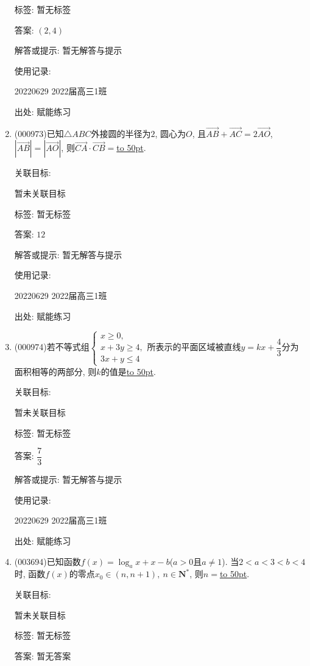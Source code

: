 \documentclass[10pt,a4paper]{article}
\newcommand{\blank}[1]{\underline{\hbox to #1pt{}}}
\begin{document}
\begin{enumerate}[1.]
标签: 暂无标签

答案: $(2,4)$

解答或提示: 暂无解答与提示

使用记录:

20220629    2022届高三1班  	


出处: 赋能练习
\item { (000973)}已知$\triangle ABC$外接圆的半径为$2$, 圆心为$O$, 且$\overrightarrow{AB}+\overrightarrow{AC}=2 \overrightarrow{AO}$, $|\overrightarrow{AB}|=|\overrightarrow{AO}|$, 则$\overrightarrow{CA}\cdot \overrightarrow{CB}=$\blank{50}.


关联目标:

暂未关联目标



标签: 暂无标签

答案: $12$

解答或提示: 暂无解答与提示

使用记录:

20220629    2022届高三1班  	


出处: 赋能练习
\item { (000974)}若不等式组$\begin{cases} x\ge 0, \\ x+3y\ge 4, \\  3x+y\le 4 \end{cases}$所表示的平面区域被直线$y=kx+\dfrac 43$分为面积相等的两部分, 则$k$的值是\blank{50}.


关联目标:

暂未关联目标



标签: 暂无标签

答案: $\dfrac{7}{3}$

解答或提示: 暂无解答与提示

使用记录:

20220629    2022届高三1班  	


出处: 赋能练习
\item { (003694)}已知函数$f(x)=\log_a x+x-b$($a>0$且$a\ne 1$). 当$2<a<3<b<4$时, 函数$f(x)$的零点$x_0\in (n,n+1), \ n\in \mathbf{N}^*$, 则$n=$\blank{50}.


关联目标:

暂未关联目标



标签: 暂无标签

答案: 暂无答案


\end{enumerate}
\end{document}

